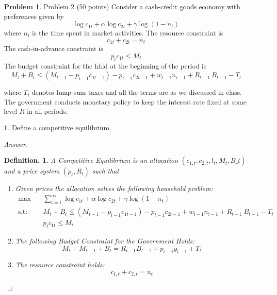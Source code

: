 \documentclass[12pt]{article}
\newtheorem{defin}{Definition.}
\theoremstyle{definition}
\newtheorem{problem}{Problem}
\newtheorem{subproblem}{}[problem]
\begin{document}
\begin{problem}
Problem 2 (50 points) Consider a cash-credit goods economy with preferences given by
$$
\log c_{1 {t}}+\alpha \log c_{2 {t}}+\gamma \log \left(1-n_{{t}}\right)
$$
where $n_{t}$ is the time spent in market activities. The resource constraint is
$$
{c}_{1 {t}}+{c}_{2 {t}}=n_{{t}}
$$
The cash-in-advance constraint is
$$
p_{t} c_{1 t} \leqslant M_{t}
$$
The budget constraint for the hhld at the beginning of the period is
$$
M_{{t}}+{B}_{{t}} \leqslant\left(M_{{t}-1}-{p}_{{t}-1} {c}_{1 {t}-1}\right)-{p}_{{t}-1} {c}_{2 {t}-1}+w_{{t}-1} {n}_{{t}-1}+{R}_{{t}-1} {~B}_{{t}-1}-{T}_{{t}}
$$

where $T_{t}$ denotes lump-sum taxes and all the terms are as we discussed in class. The government conducts monetary policy to keep the interest rate fixed at some level ${R}$ in all periods.

\end{problem}

\begin{subproblem}
    Define a competitive equilibrium.
\end{subproblem}
\begin{proof}[Answer]
\begin{defin} A Competitive Equilibrium is an allocation $\left(c_{1,t}, c_{2,t}, l_t, M_t, B\_t\right)$ and a price system $\left(p_t, R_t\right)$ such that

\begin{enumerate}
    \item Given prices the allocation solves the following household problem:
    \begin{align*}
        \max&\quad \sum_{t=1}^\infty{\log c_{1 {t}}+\alpha \log c_{2 {t}}+\gamma \log \left(1-n_{{t}}\right)}\\
        \text{s.t:}&\quad M_{{t}}+{B}_{{t}} \leqslant\left(M_{{t}-1}-{p}_{{t}-1} {c}_{1 {t}-1}\right)-{p}_{{t}-1} {c}_{2 {t}-1}+w_{{t}-1} {n}_{{t}-1}+{R}_{{t}-1} {~B}_{{t}-1}-{T}_{{t}}\\
        &\quad p_{t} c_{1 t} \leqslant M_{t}
    \end{align*}
    \item The following Budget Constraint for the Government Holds:
    $$M_t-M_{t-1}+B_t=R_{t-1}B_{t-1}+p_{t-1}g_{t-1} + T_t$$
    
    \item The resource constraint holds:
    $$c_{1,t}+c_{2,t} = n_t$$
\end{enumerate}

\end{defin}
\end{proof}
\end{document}
